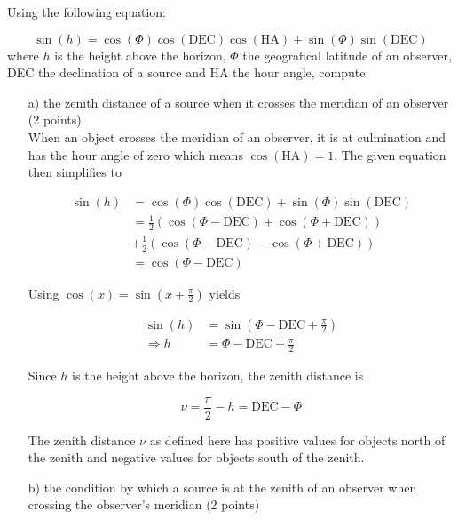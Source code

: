 \documentclass[11pt,a4paper,twoside]{article}
\begin{document}
Using the following equation: 

\begin{equation}
 \sin{ \left( h \right)} = \cos{ \left( \Phi \right)} \cos{ \left( \text{DEC} \right)} \cos{ \left( \text{HA} \right)} + \sin{ \left( \Phi \right)} \sin{ \left( \text{DEC} \right)}
\end{equation}
where $h$ is the height above the horizon, $\Phi$ the geografical latitude of an observer, DEC the declination of a source and HA the hour angle, compute: 

\begin{enumerate}
 \item[a)] the zenith distance of a source when it crosses the meridian of an observer (2 points) \\
 When an object crosses the meridian of an observer, it is at culmination and has the hour angle of zero which means $\cos{ \left( \text{HA} \right)} = 1$. The given equation then simplifies to 
 
 \begin{align}
  \sin{ \left( h \right)} &= \cos{ \left( \Phi \right)} \cos{ \left( \text{DEC} \right)} + \sin{ \left( \Phi \right)} \sin{ \left( \text{DEC} \right)} \\
  &= \frac{1}{2} \left( \cos{ \left( \Phi - \text{DEC} \right)} + \cos{ \left( \Phi + \text{DEC} \right)} \right) \\ &+ \frac{1}{2} \left( \cos{ \left( \Phi - \text{DEC} \right)} - \cos{ \left( \Phi + \text{DEC} \right)} \right) \\
  &= \cos{ \left( \Phi - \text{DEC} \right)}
 \end{align}
  
 Using $\cos{ \left( x \right)} = \sin{ \left( x + \frac{\pi}{2} \right)}$ yields 
  
 \begin{align}
  \sin{ \left( h \right)} &= \sin{ \left( \Phi - \text{DEC} + \frac{\pi}{2} \right)} \\
  \Rightarrow h &= \Phi - \text{DEC} + \frac{\pi}{2}
 \end{align}
  
 Since $h$ is the height above the horizon, the zenith distance is 
  
 \begin{equation}
  \nu = \frac{\pi}{2} - h = \text{DEC} - \Phi
 \end{equation}
  
 The zenith distance $\nu$ as defined here has positive values for objects north of the zenith and negative values for objects south of the zenith. \\
 
 \item[b)] the condition by which a source is at the zenith of an observer when crossing the observer's meridian (2 points) \\
 
 

\end{enumerate}
\end{document}
